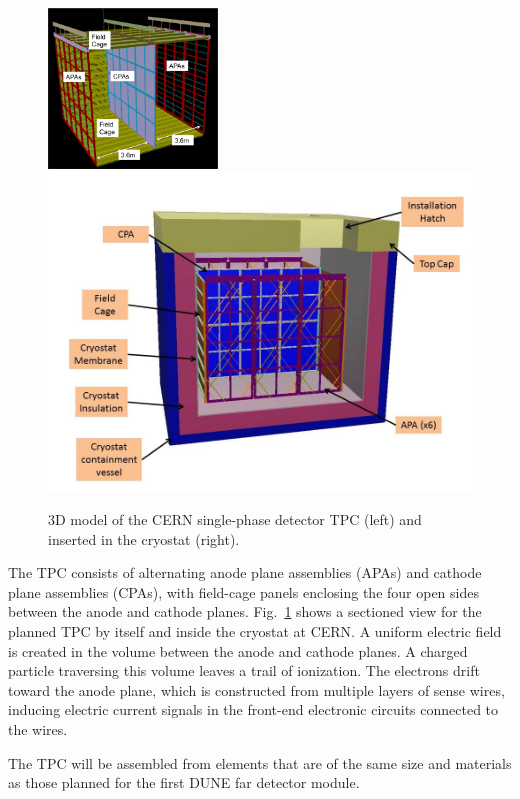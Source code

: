 \begin{figure}[htb]
\centering
\begin{minipage}[b]{1.0\textwidth}
\begin{center}
\includegraphics[width=0.40\textwidth]{figures/CERN_single_TPC}
\includegraphics[width=.59\textwidth]{figures/TPC-3D-section.jpg}
\end{center}
\end{minipage}
\caption{\small 3D model of the CERN single-phase detector TPC (left) and inserted in the cryostat (right).}
\label{fig:CERNdet-overview}
\end{figure}

The TPC consists of alternating anode plane assemblies (APAs) and cathode plane assemblies (CPAs), with field-cage panels enclosing the four open sides between the anode and cathode planes.  Fig.~\ref{fig:CERNdet-overview} shows a sectioned view for the planned TPC 
by itself and inside the cryostat at CERN.  A uniform electric field is created in the volume between the anode and cathode planes. A charged particle traversing this volume leaves a trail of ionization. The electrons drift toward the anode plane, which is constructed from multiple layers of sense wires, inducing electric current signals in the front-end electronic circuits connected to the wires.

The TPC will be assembled from elements that are of the same size and materials as those planned for the first DUNE far detector module.  

